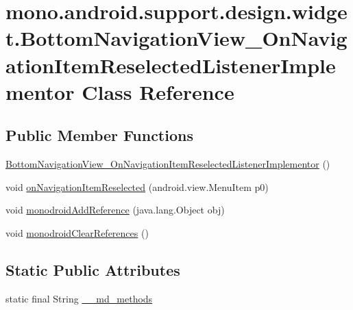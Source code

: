 \hypertarget{classmono_1_1android_1_1support_1_1design_1_1widget_1_1_bottom_navigation_view___on_navigation_ibc61d53e910ce9033a3261f22503637c}{
\section{mono.android.support.design.widget.BottomNavigationView\_\-OnNavigationItemReselectedListenerImplementor Class Reference}
\label{classmono_1_1android_1_1support_1_1design_1_1widget_1_1_bottom_navigation_view___on_navigation_ibc61d53e910ce9033a3261f22503637c}
}
\subsection*{Public Member Functions}
\begin{CompactItemize}
\item 
\hyperlink{classmono_1_1android_1_1support_1_1design_1_1widget_1_1_bottom_navigation_view___on_navigation_ibc61d53e910ce9033a3261f22503637c_8a76221b038b9d28bc047e1975550283}{BottomNavigationView\_\-OnNavigationItemReselectedListenerImplementor} ()
\item 
void \hyperlink{classmono_1_1android_1_1support_1_1design_1_1widget_1_1_bottom_navigation_view___on_navigation_ibc61d53e910ce9033a3261f22503637c_97f63c614da455d7565ed717008441d5}{onNavigationItemReselected} (android.view.MenuItem p0)
\item 
void \hyperlink{classmono_1_1android_1_1support_1_1design_1_1widget_1_1_bottom_navigation_view___on_navigation_ibc61d53e910ce9033a3261f22503637c_6ad94b3297cb5542f2e5e7c5dc6639d2}{monodroidAddReference} (java.lang.Object obj)
\item 
void \hyperlink{classmono_1_1android_1_1support_1_1design_1_1widget_1_1_bottom_navigation_view___on_navigation_ibc61d53e910ce9033a3261f22503637c_5d09bb6c88dcc41be8479b8f930508ec}{monodroidClearReferences} ()
\end{CompactItemize}
\subsection*{Static Public Attributes}
\begin{CompactItemize}
\item 
static final String \hyperlink{classmono_1_1android_1_1support_1_1design_1_1widget_1_1_bottom_navigation_view___on_navigation_ibc61d53e910ce9033a3261f22503637c_41a4daa4812cd7f025a550d0e1ceb2db}{\_\-\_\-md\_\-methods}
\end{CompactItemize}
